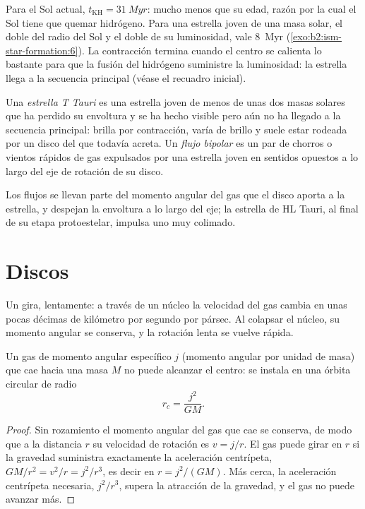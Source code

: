 Para el Sol actual, $t_{\mathrm{KH}} = \qty{31}{Myr}$: mucho menos que su
edad, razón por la cual el Sol tiene que quemar hidrógeno. Para una estrella joven de una masa
solar, el doble del radio del Sol y el doble de su luminosidad, vale \qty{8}{Myr}
(\cref{exo:b2:ism-star-formation:6}). La contracción termina cuando el centro se calienta lo bastante para que la fusión del hidrógeno
suministre la luminosidad: la estrella llega a la secuencia principal (véase el recuadro inicial).

\begin{definition}\label{def:b2:ism-star-formation:t-tauri}
Una \emph{estrella T Tauri} es una estrella joven de menos de unas
dos masas solares que ha perdido su envoltura y se ha hecho visible pero aún no ha
llegado a la secuencia principal: brilla por contracción, varía de
brillo y suele estar rodeada por un disco del que todavía
acreta. Un \emph{flujo bipolar} es un par de chorros
o vientos rápidos de gas expulsados por una estrella joven en sentidos opuestos a lo largo del
eje de rotación de su disco.
\end{definition}

Los flujos se llevan parte del momento angular del gas que el disco
aporta a la estrella, y despejan la envoltura a lo largo del eje; la estrella de
HL Tauri, al final de su etapa protoestelar, impulsa uno muy
colimado.

\section{Discos}

Un  gira, lentamente: a través de un núcleo la velocidad del gas cambia en unas pocas
décimas de kilómetro por segundo por pársec. Al colapsar el núcleo, su
momento angular se conserva, y la rotación lenta se vuelve rápida.

\begin{proposition}\label{prop:b2:ism-star-formation:centrifugal}
Un gas de momento angular específico $j$ (momento angular por unidad de masa)
que cae hacia una masa $M$ no puede alcanzar el centro: se instala en una órbita
circular de radio
\[
  r_c = \frac{j^2}{G M}.
\]
\end{proposition}

\begin{proof}
Sin rozamiento el momento angular del gas que cae se conserva, de modo que a
la distancia $r$ su velocidad de rotación es $v = j/r$. El gas puede girar en $r$ si
la gravedad suministra exactamente la aceleración centrípeta,
$GM/r^2 = v^2/r = j^2/r^3$, es decir en $r = j^2/(GM)$. Más cerca, la
aceleración centrípeta necesaria, $j^2/r^3$, supera la atracción de la gravedad, y
el gas no puede avanzar más.
\end{proof}

